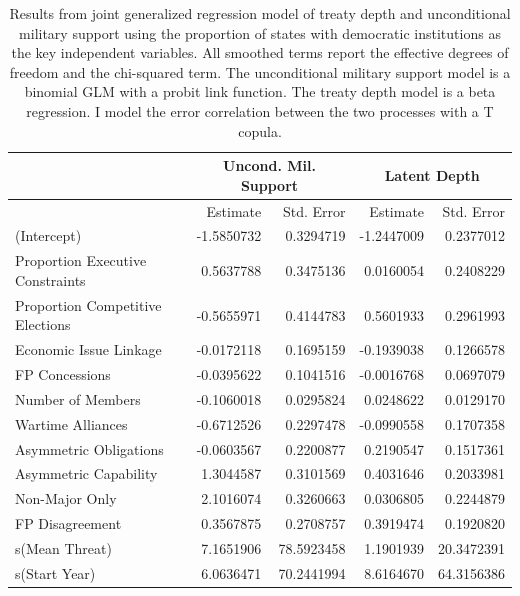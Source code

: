 \documentclass[12pt]{article}
\begin{document}
\begin{table}[ht]
\centering
\begin{tabular}{lrrrr}
  & \multicolumn{2}{c}{Uncond. Mil. Support} & \multicolumn{2}{c}{Latent Depth}\\ \hline
 & Estimate & Std. Error & Estimate & Std. Error \\ 
  \hline
(Intercept) & -1.5850732 & 0.3294719 & -1.2447009 & 0.2377012 \\ 
  Proportion Executive Constraints & 0.5637788 & 0.3475136 & 0.0160054 & 0.2408229 \\ 
  Proportion Competitive Elections & -0.5655971 & 0.4144783 & 0.5601933 & 0.2961993 \\ 
  Economic Issue Linkage & -0.0172118 & 0.1695159 & -0.1939038 & 0.1266578 \\ 
  FP Concessions & -0.0395622 & 0.1041516 & -0.0016768 & 0.0697079 \\ 
  Number of Members & -0.1060018 & 0.0295824 & 0.0248622 & 0.0129170 \\ 
  Wartime Alliances & -0.6712526 & 0.2297478 & -0.0990558 & 0.1707358 \\ 
  Asymmetric Obligations & -0.0603567 & 0.2200877 & 0.2190547 & 0.1517361 \\ 
  Asymmetric Capability & 1.3044587 & 0.3101569 & 0.4031646 & 0.2033981 \\ 
  Non-Major Only & 2.1016074 & 0.3260663 & 0.0306805 & 0.2244879 \\ 
  FP Disagreement & 0.3567875 & 0.2708757 & 0.3919474 & 0.1920820 \\ 
  s(Mean Threat) & 7.1651906 & 78.5923458 & 1.1901939 & 20.3472391 \\ 
  s(Start Year) & 6.0636471 & 70.2441994 & 8.6164670 & 64.3156386 \\ 
   \hline
\end{tabular}
\caption{Results from joint generalized regression model of treaty depth and unconditional military support using the proportion of states with democratic institutions as the key independent variables. 
                     All smoothed terms report the effective degrees of freedom and the chi-squared term. 
                     The unconditional military support model is a binomial GLM with a probit link function. 
                     The treaty depth model is a beta regression. 
                     I model the error correlation between the two processes with a T copula.} 
\label{tab:gjrm-res-prop}
\end{table}
\end{document}
